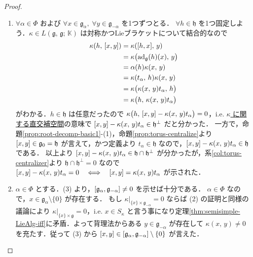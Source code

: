 \documentclass[rep_main]{subfiles}
\begin{document}
\begin{proof}
\begin{enumerate}
		\item $\forall \alpha \in \Phi$ および $\forall x \in \mathfrak{g}_\alpha,\; \forall y \in \mathfrak{g}_{-\alpha}$ を1つずつとる．
		$\forall h \in \mathfrak{h}$ を1つ固定しよう．$\kappa \in L(\mathfrak{g},\, \mathfrak{g};\, \mathbb{K})$ は対称かつLieブラケットについて結合的なので
		\begin{align}
			\kappa (h,\, \comm{x}{y}) 
			&= \kappa (\comm{h}{x},\, y) \\
			&= \kappa \bigl(\ad_{\mathfrak{g}}(h)(x),\, y\bigr) \\
			&= \alpha(h) \kappa(x,\, y) \\
			&= \kappa(t_\alpha,\, h) \kappa(x,\, y) \\
			&= \kappa \bigl( \kappa(x,\, y) t_\alpha,\, h \bigr) \\
			&= \kappa \bigl( h,\, \kappa(x,\, y) t_\alpha\bigr) \\
		\end{align}
		がわかる．$h \in \mathfrak{h}$ は任意だったので $\kappa \bigl( h,\, \comm{x}{y} - \kappa(x,\, y) t_\alpha \bigr) = 0$，i.e. \hyperref[def:radical-bilinear]{$\kappa$ に関する直交補空間}の意味で $\comm{x}{y} - \kappa(x,\, y) t_\alpha \in \mathfrak{h}^\perp$ だと分かった．
		一方で，命題\ref{prop:root-decomp-basic1}-(1)，命題\ref{prop:torus-centralize}より $\comm{x}{y} \in \mathfrak{g}_0 = \mathfrak{h}$ が言えて，かつ定義より $t_\alpha \in \mathfrak{h}$ なので，$\comm{x}{y} - \kappa(x,\, y) t_\alpha \in \mathfrak{h}$ である．
		以上より $\comm{x}{y} - \kappa(x,\, y) t_\alpha \in \mathfrak{h} \cap \mathfrak{h}^\perp$ が分かったが，系\ref{col:torus-centralizer}より $\mathfrak{h} \cap \mathfrak{h}^\perp = 0$ なので $\comm{x}{y} - \kappa(x,\, y) t_\alpha = 0 \IFF \comm{x}{y} = \kappa(x,\, y) t_\alpha$ が示された．
		
		\item $\alpha \in \Phi$ とする．(3) より，$\comm{\mathfrak{g}_\alpha}{\mathfrak{g}_{-\alpha}} \neq 0$ を示せば十分である．
		$\alpha \in \Phi$ なので，$x \in \mathfrak{g}_\alpha \setminus \{0\}$ が存在する．
		もし $\kappa|_{\{x\} \times \mathfrak{g}_{-\alpha}} = 0$ ならば (2) の証明と同様の議論により $\kappa|_{\{x\} \times \mathfrak{g}} = 0$，i.e. $x \in S_\kappa$ と言う事になり定理\ref{thm:semisimple-LieAlg-iff}に矛盾．よって背理法からある $y \in \mathfrak{g}_{-\alpha}$ が存在して $\kappa(x,\, y) \neq 0$ を充たす．従って (3) から $\comm{x}{y} \in \comm{\mathfrak{g}_\alpha}{\mathfrak{g}_{-\alpha}} \setminus \{0\}$ が言えた．


\end{enumerate}
\end{proof}
\end{document}
